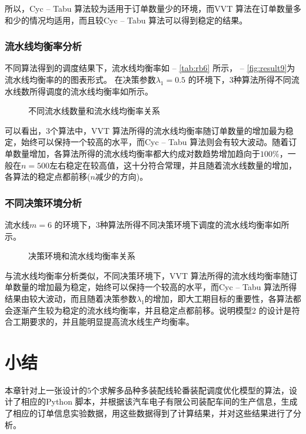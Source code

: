 所以，Cyc -- Tabu 算法较为适用于订单数量少的环境，而VVT 算法在订单数量多和少的情况均适用，而且较Cyc -- Tabu 算法可以得到稳定的结果。

\subsubsection{流水线均衡率分析}
不同算法得到的调度结果下，流水线均衡率如 -- \ref{tab:rb6} 所示， -- \ref{fig:result9}为流水线均衡率的的图表形式。
在决策参数$\lambda_1 = 0.5$ 的环境下，$3$种算法所得不同流水线数所得调度的流水线均衡率如所示。
\begin{figure}[h]
\centering
{}
\caption{不同流水线数量和流水线均衡率关系}\label{fig:linenumbervsrate}
\end{figure}

可以看出，$3$个算法中，VVT 算法所得的流水线均衡率随订单数量的增加最为稳定，始终可以保持一个较高的水平，而Cyc -- Tabu 算法则会有较大波动。随着订单数量增加，各算法所得的流水线均衡率都大约成对数趋势增加趋向于$100\%$，一般在$n = 500$左右稳定在较高值，这十分符合常理，并且随着流水线数量的增加，各算法的稳定点都前移($n$减少的方向)。

\subsubsection{不同决策环境分析}
流水线$m = 6$ 的环境下，$3$种算法所得不同决策环境下调度的流水线均衡率如所示。
\begin{figure}
\centering
{}
\caption{决策环境和流水线均衡率关系}\label{fig:decisionvsrate}
\end{figure}

与流水线均衡率分析类似，不同决策环境下，VVT 算法所得的流水线均衡率随订单数量的增加最为稳定，始终可以保持一个较高的水平，而Cyc -- Tabu 算法所得结果由较大波动，而且随着决策参数$\lambda_1$的增加，即大工期目标的重要性，各算法都会逐渐产生较为稳定的流水线均衡率，并且稳定点都前移。说明模型2 的设计是符合工期要求的，并且能明显提高流水线生产均衡率。

\section{小结}
本章针对上一张设计的$5$个求解多品种多装配线轮番装配调度优化模型的算法，设计了相应的Python 脚本，并根据该汽车电子有限公司装配车间的生产信息，生成了相应的订单信息实验数据，用这些数据得到了计算结果，并对这些结果进行了分析。

